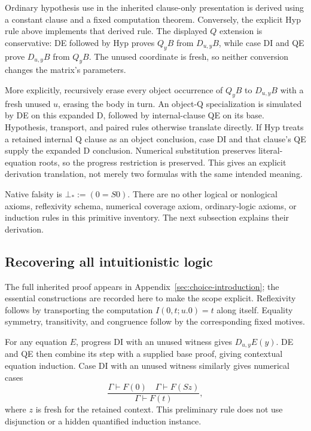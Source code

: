 Ordinary hypothesis use in the inherited clause-only presentation is
derived using a constant clause and a fixed computation theorem.
Conversely, the explicit Hyp rule above implements that derived rule.
The displayed $Q$ extension is conservative: DE followed by Hyp
proves $Q_yB$ from $D_{u,y}B$, while case DI and QE prove
$D_{u,y}B$ from $Q_yB$. The unused coordinate is fresh, so neither
conversion changes the matrix's parameters.

More explicitly, recursively erase every object occurrence of $Q_yB$
to $D_{u,y}B$ with a fresh unused $u$, erasing the body in turn.
An object-Q specialization is simulated by DE on this expanded D,
followed by internal-clause QE on its base. Hypothesis, transport,
and paired rules otherwise translate directly. If Hyp treats a
retained internal Q clause as an object conclusion, case DI and
that clause's QE supply the expanded D conclusion. Numerical
substitution preserves literal-equation roots, so the progress
restriction is preserved. This gives an explicit derivation
translation, not merely two formulas with the same intended meaning.

Native falsity is $\bot_*:=(0=S0)$. There are no other logical or
nonlogical axioms, reflexivity schema, numerical coverage axiom,
ordinary-logic axioms, or induction rules in this primitive inventory.
The next subsection explains their derivation.

\subsection{Recovering all intuitionistic logic}

The full inherited proof appears in Appendix~\ref{sec:choice-introduction};
the essential constructions are recorded here to make the scope explicit.
Reflexivity follows by transporting the computation
$I(0,t;u.0)=t$ along itself. Equality symmetry, transitivity, and
congruence follow by the corresponding fixed motives.

For any equation $E$, progress DI with an unused witness gives
$D_{u,y}E(y)$. DE and QE then combine its step with a supplied
base proof, giving contextual equation induction. Case DI with
an unused witness similarly gives numerical cases
\[
 \frac{\Gamma\vdash F(0)\quad\Gamma\vdash F(Sz)}
      {\Gamma\vdash F(t)},
\]
where $z$ is fresh for the retained context. This preliminary rule
does not use disjunction or a hidden quantified induction instance.

